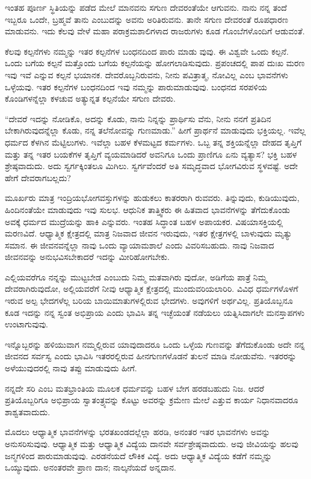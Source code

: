 ಇಂತಹ ಪೂರ್ಣ ಸ್ಥಿತಿಯನ್ನು ಪಡೆದ ಮೇಲೆ ಮಾನವನು ಸಗುಣ ದೇವರಂತೆಯೇ ಆಗುವನು. ನಾನು ನನ್ನ ತಂದೆ ಇಬ್ಬರೂ ಒಂದೇ, ಬ್ರಹ್ಮವೆ ತಾನು ಎಂಬುದನ್ನು ಅವನು ಅರಿತಿರುವನು. ತಾನೇ ಸಗುಣ ದೇವರಂತೆ ರೂಪಧಾರಣ ಮಾಡುವನು. ಇದು ಕೆಲವು ವೇಳೆ ಮಹಾ ಪರಾಕ್ರಮಶಾಲಿಗಳಾದ ರಾಜರುಗಳು ಕೂಡ ಗೊಂಬೆಗಳೊಂದಿಗೆ ಆಡುವಂತೆ.

ಕೆಲವು ಕಲ್ಪನೆಗಳು ನಮ್ಮನ್ನು ಇತರ ಕಲ್ಪನೆಗಳ ಬಂಧನದಿಂದ ಪಾರು ಮಾಡು ವುವು. ಈ ವಿಶ್ವವೇ ಒಂದು ಕಲ್ಪನೆ. ಒಂದು ಬಗೆಯ ಕಲ್ಪನೆ ಮತ್ತೊಂದು ಬಗೆಯ ಕಲ್ಪನೆಯನ್ನು ಹೋಗಲಾಡಿಸುವುದು. ಪ್ರಪಂಚದಲ್ಲಿ ಪಾಪ ದುಃಖ ಮರಣ ಇವು ಇವೆ ಎನ್ನುವ ಕಲ್ಪನೆ ಭಯಾನಕ. ದೇವರೊಬ್ಬನಿರುವನು, ನೀನು ಪವಿತ್ರಾತ್ಮ, ನೋವಿಲ್ಲ ಎಂಬ ಭಾವನೆಗಳು ಒಳ್ಳೆಯವು. ಇತರ ಕಲ್ಪನೆಗಳ ಬಂಧನದಿಂದ ಇವು ನಮ್ಮನ್ನು ಪಾರುಮಾಡುವುವು. ಬಂಧನದ ಸರಪಳಿಯ ಕೊಂಡಿಗಳನ್ನೆಲ್ಲಾ ಕಳಚುವ ಅತ್ಯುನ್ನತ ಕಲ್ಪನೆಯೇ ಸಗುಣ ದೇವರು.

“ದೇವರೆ ಇದನ್ನು ನೋಡಿಕೊ, ಅದನ್ನು ಕೊಡು, ನಾನು ನಿನ್ನನ್ನು ಪ್ರಾರ್ಥಿಸು ವೆನು, ನೀನು ನನಗೆ ಪ್ರತಿದಿನ ಬೇಕಾಗಿರುವುದನ್ನೆಲ್ಲಾ ಕೊಡು, ನನ್ನ ತಲೆನೋವನ್ನು ಗುಣಮಾಡು.” ಹೀಗೆ ಪ್ರಾರ್ಥನೆ ಮಾಡುವುದು ಭಕ್ತಿಯಲ್ಲ. ಇವೆಲ್ಲ ಧರ್ಮದ ಕೆಳಗಿನ ಮೆಟ್ಟಿಲುಗಳು. ಇವೆಲ್ಲಾ ಬಹಳ ಕೆಳಮಟ್ಟದ ಕರ್ಮಗಳು. ಒಬ್ಬ ತನ್ನ ಶಕ್ತಿಯನ್ನೆಲ್ಲಾ ದೇಹದ ತೃಪ್ತಿಗೆ ಮತ್ತು ತನ್ನ ಇತರ ಬಯಕೆಗಳ ತೃಪ್ತಿಗೆ ವ್ಯಯಮಾಡಿದರೆ ಅವನಿಗೂ ಒಂದು ಪ್ರಾಣಿಗೂ ಏನು ವ್ಯತ್ಯಾಸ? ಭಕ್ತಿ ಬಹಳ ಶ್ರೇಷ್ಠವಾದುದು. ಅದು ಸ್ವರ್ಗಕ್ಕಿಂತಲೂ ಮಿಗಿಲು. ಸ್ವರ್ಗವೆಂದರೆ ಅತಿ ಸಮೃದ್ಧವಾದ ಭೋಗವಿರುವ ಸ್ಥಳವಷ್ಟೆ. ಅದೇ ಹೇಗೆ ದೇವರಾಗಬಲ್ಲದು?

ಮೂರ್ಖರು ಮಾತ್ರ ಇಂದ್ರಿಯಭೋಗವಸ್ತುಗಳನ್ನು ಹುಡುಕಲು ಕಾತರರಾಗಿ ರುವವರು. ತಿನ್ನುವುದು, ಕುಡಿಯುವುದು, ಹಿಂದಿನಂತೆಯೇ ಮಾಡುವುದು ಇವು ಸುಲಭ. ಆಧುನಿಕ ತಾತ್ತ್ವಿಕರು ಈ ಹಿತವಾದ ಭಾವನೆಗಳನ್ನು ತೆಗೆದುಕೊಂಡು ಅವಕ್ಕೆ ಧರ್ಮದ ಮುದ್ರೆಯನ್ನು ಹಾಕಿ ಎನ್ನುವರು. ಇಂತಹ ಸಿದ್ಧಾಂತ ಬಹಳ ಅಪಾಯಕರ. ವಿಷಯಾಸಕ್ತಿಯಲ್ಲಿ ಮರಣವಿದೆ. ಆಧ್ಯಾತ್ಮಿಕ ಕ್ಷೇತ್ರದಲ್ಲಿ ಮಾತ್ರ ನಿಜವಾದ ಜೀವನ ಇರುವುದು, ಇತರ ಕ್ಷೇತ್ರಗಳಲ್ಲಿ ಬಾಳುವುದು ಮೃತ್ಯು ಸಮಾನ. ಈ ಜೀವನವನ್ನೆಲ್ಲಾ ನಾವು ಒಂದು ವ್ಯಾಯಾಮಶಾಲೆ ಎಂದು ವಿವರಿಸಬಹುದು. ನಾವು ನಿಜವಾದ ಜೀವನವನ್ನು ಅನುಭವಿಸಬೇಕಾದರೆ ಇದನ್ನು ಮೀರಿಹೋಗಬೇಕು.

ಎಲ್ಲಿಯವರೆಗೂ ನನ್ನನ್ನು ಮುಟ್ಟಬೇಡ ಎಂಬುದು ನಿಮ್ಮ ಮತವಾಗಿರು ವುದೋ, ಅಡಿಗೆಯ ಪಾತ್ರೆ ನಿಮ್ಮ ದೇವರಾಗಿರುವುದೋ, ಅಲ್ಲಿಯವರೆಗೆ ನೀವು ಆಧ್ಯಾತ್ಮಿಕ ಕ್ಷೇತ್ರದಲ್ಲಿ ಮುಂದುವರಿಯಲಾರಿರಿ. ವಿವಿಧ ಧರ್ಮಗಳೊಳಗೆ ಇರುವ ಅಲ್ಪ ಭೇದಗಳೆಲ್ಲ ಬರಿಯ ಬಾಯಿಮಾತುಗಳಲ್ಲಿರುವ ಭೇದಗಳು. ಅವುಗಳಿಗೆ ಅರ್ಥವಿಲ್ಲ. ಪ್ರತಿಯೊಬ್ಬನೂ ಕೂಡ ಇದನ್ನು ನನ್ನ ಸ್ವಂತ ಅಭಿಪ್ರಾಯ ಎಂದು ಭಾವಿಸಿ ತನ್ನ ಇಚ್ಛೆಯಂತೆ ನಡೆಯಲು ಯತ್ನಿಸಿದಾಗಲೇ ಮನಸ್ತಾಪಗಳು ಉಂಟಾಗುವುವು.

ಇನ್ನೊಬ್ಬರನ್ನು ಹಳಿಯುವಾಗ ನಮ್ಮಲ್ಲಿರುವ ಯಾವುದಾದರೂ ಒಂದು ಒಳ್ಳೆಯ ಗುಣವನ್ನು ತೆಗೆದುಕೊಂಡು ಅದೇ ನನ್ನ ಜೀವನದ ಸರ್ವಸ್ವ ಎಂದು ಭಾವಿಸಿ ಇತರರಲ್ಲಿರುವ ಹೀನಗುಣಗಳೊಡನೆ ತುಲನೆ ಮಾಡಿ ನೋಡುವೆನು. ಇತರರನ್ನು ಅಳೆಯುವುದರಲ್ಲಿ ನಾವು ತಪ್ಪು ಮಾಡುವುದು ಹೀಗೆ.

ನನ್ನದೇ ಸರಿ ಎಂಬ ಮತಭ್ರಾಂತಿಯ ಮೂಲಕ ಧರ್ಮವನ್ನು ಬಹಳ ಬೇಗ ಹರಡಬಹುದು ನಿಜ. ಆದರೆ ಪ್ರತಿಯೊಬ್ಬರಿಗೂ ಅಭಿಪ್ರಾಯ ಸ್ವಾತಂತ್ರ್ಯವನ್ನು ಕೊಟ್ಟು ಅವರನ್ನು ಕ್ರಮೇಣ ಮೇಲೆ ಎತ್ತುವ ಕಾರ್ಯ ನಿಧಾನವಾದರೂ ಶಾಶ್ವತವಾದುದು.

ಮೊದಲು ಆಧ್ಯಾತ್ಮಿಕ ಭಾವನೆಗಳನ್ನು ಭರತಖಂಡದಲ್ಲೆಲ್ಲಾ ಹರಡಿ, ಅನಂತರ ಇತರ ಭಾವನೆಗಳು ಅವನ್ನು ಅನುಸರಿಸುವುವು. ಆಧ್ಯಾತ್ಮಿಕ ಮತ್ತು ಆಧ್ಯಾತ್ಮಿಕ ವಿದ್ಯೆಯ ದಾನವೇ ಸರ್ವಶ್ರೇಷ್ಠವಾದುದು. ಅವು ಜೀವಿಯನ್ನು ಹಲವು ಜನ್ಮಗಳಿಂದ ಪಾರುಮಾಡುವುವು. ಎರಡನೆಯದೆ ಲೌಕಿಕ ವಿದ್ಯೆ. ಅದು ಆಧ್ಯಾತ್ಮಿಕ ವಿದ್ಯೆಯ ಕಡೆಗೆ ನಮ್ಮನ್ನು ಒಯ್ಯುವುದು. ಅನಂತರವೇ ಪ್ರಾಣ ದಾನ; ನಾಲ್ಕನೆಯದೆ ಅನ್ನದಾನ.

